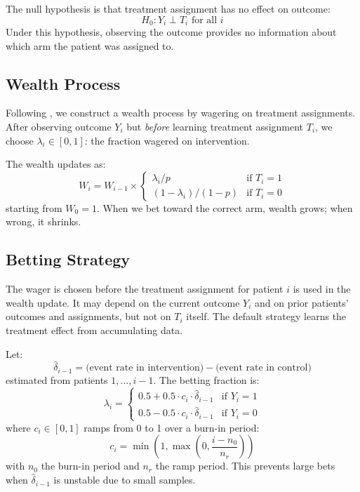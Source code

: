 \documentclass[10pt]{article}
\begin{document}
The null hypothesis is that treatment assignment has no effect on outcome:
\begin{equation}
H_0: Y_i \perp T_i \text{ for all } i
\end{equation}
Under this hypothesis, observing the outcome provides no information about which arm the patient was assigned to.

\subsection{Wealth Process}

Following \citet{pmlr-v177-duan22a}, we construct a wealth process by wagering on treatment assignments. After observing outcome $Y_i$ but \emph{before} learning treatment assignment $T_i$, we choose $\lambda_i \in [0, 1]$: the fraction wagered on intervention.

The wealth updates as:
\begin{equation}
W_i = W_{i-1} \times 
\begin{cases}
\lambda_i / p & \text{if } T_i = 1 \\
(1 - \lambda_i) / (1-p) & \text{if } T_i = 0
\end{cases}
\end{equation}
starting from $W_0 = 1$. When we bet toward the correct arm, wealth grows; when wrong, it shrinks.

\subsection{Betting Strategy}

The wager is chosen before the treatment assignment for patient $i$ is used in the wealth update. It may depend on the current outcome $Y_i$ and on prior patients' outcomes and assignments, but not on $T_i$ itself. The default strategy learns the treatment effect from accumulating data.

Let:
\begin{equation}
\hat{\delta}_{i-1} = \text{(event rate in intervention)} - \text{(event rate in control)}
\end{equation}
estimated from patients $1, \ldots, i-1$. The betting fraction is:
\begin{equation}
\lambda_i = 
\begin{cases}
0.5 + 0.5 \cdot c_i \cdot \hat{\delta}_{i-1} & \text{if } Y_i = 1 \\
0.5 - 0.5 \cdot c_i \cdot \hat{\delta}_{i-1} & \text{if } Y_i = 0
\end{cases}
\end{equation}
where $c_i \in [0, 1]$ ramps from 0 to 1 over a burn-in period:
\begin{equation}
c_i = \min\left(1, \max\left(0, \frac{i - n_0}{n_r}\right)\right)
\end{equation}
with $n_0$ the burn-in period and $n_r$ the ramp period. This prevents large bets when $\hat{\delta}_{i-1}$ is unstable due to small samples.
\end{document}
